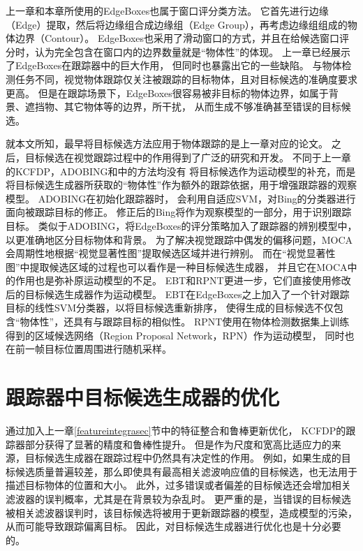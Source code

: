上一章和本章所使用的EdgeBoxes也属于窗口评分类方法。
它首先进行边缘（Edge）提取，然后将边缘组合成边缘组（Edge Group），再考虑边缘组组成的物体边界（Contour）。
EdgeBoxes也采用了滑动窗口的方式，并且在给候选窗口评分时，认为完全包含在窗口内的边界数量就是``物体性''的体现。
上一章已经展示了EdgeBoxes在跟踪器中的巨大作用，
但同时也暴露出它的一些缺陷。
与物体检测任务不同，视觉物体跟踪仅关注被跟踪的目标物体，且对目标候选的准确度要求更高。
但是在跟踪场景下，EdgeBoxes很容易被非目标的物体边界，如属于背景、遮挡物、其它物体等的边界，所干扰，
从而生成不够准确甚至错误的目标候选。

就本文所知，最早将目标候选方法应用于物体跟踪的是上一章对应的论文。
之后，目标候选在视觉跟踪过程中的作用得到了广泛的研究和开发\citep{proposalSelect, adobing, ebt, rpnt, moca}。
不同于上一章的KCFDP，ADOBING和\cite{proposalSelect}中的方法均没有
将目标候选作为运动模型的补充，而是将目标候选生成器所获取的``物体性''作为额外的跟踪依据，用于增强跟踪器的观察模型。
ADOBING在初始化跟踪器时，
会利用自适应SVM，对Bing的分类器进行面向被跟踪目标的修正。
修正后的Bing将作为观察模型的一部分，用于识别跟踪目标。
类似于ADOBING，\cite{proposalSelect}将EdgeBoxes的评分策略加入了跟踪器的辨别模型中，以更准确地区分目标物体和背景。
为了解决视觉跟踪中偶发的偏移问题，MOCA会周期性地根据``视觉显著性图''提取候选区域并进行辨别。
而在``视觉显著性图''中提取候选区域的过程也可以看作是一种目标候选生成器，
并且它在MOCA中的作用也是弥补原运动模型的不足。
EBT和RPNT更进一步，它们直接使用修改后的目标候选生成器作为运动模型。
EBT在EdgeBoxes之上加入了一个针对跟踪目标的线性SVM分类器，以将目标候选重新排序，
使得生成的目标候选不仅包含``物体性''，还具有与跟踪目标的相似性。
RPNT使用在物体检测数据集上训练得到的区域候选网络（Region Proposal Network，RPN）作为运动模型，
同时也在前一帧目标位置周围进行随机采样。


\section{跟踪器中目标候选生成器的优化}
通过加入上一章\ref{featureintegrasec}节中的特征整合和鲁棒更新优化，
KCFDP的跟踪器部分获得了显著的精度和鲁棒性提升。
但是作为尺度和宽高比适应力的来源，目标候选生成器在跟踪过程中仍然具有决定性的作用。
例如，如果生成的目标候选质量普遍较差，那么即使具有最高相关滤波响应值的目标候选，也无法用于描述目标物体的位置和大小。
此外，过多错误或者偏差的目标候选还会增加相关滤波器的误判概率，尤其是在背景较为杂乱时。
更严重的是，当错误的目标候选被相关滤波器误判时，该目标候选将被用于更新跟踪器的模型，造成模型的污染，
从而可能导致跟踪偏离目标。
因此，对目标候选生成器进行优化也是十分必要的。

